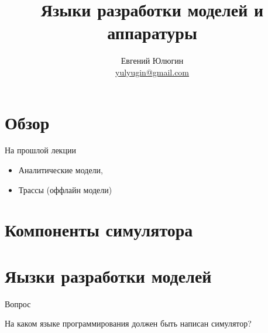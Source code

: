 

\title{Языки разработки моделей и аппаратуры}
\author[Евгений Юлюгин]{Евгений Юлюгин \\ \small{\href{mailto:yulyugin@gmail.com}{yulyugin@gmail.com}}}



\begin{frame}
\titlepage
\end{frame}

\section{Обзор}

\begin{frame}
\tableofcontents
\end{frame} 

\begin{frame}{На прошлой лекции}

\begin{itemize}
  \item Аналитические модели,
  \item Трассы (оффлайн модели)
\end{itemize}

\end{frame}

\section{Компоненты симулятора}

\begin{frame}

\begin{figure}[htp]
    \centering
\end{figure}

\end{frame}

\section{Яызки разработки моделей}

\begin{frame}{Вопрос}

На каком языке программирования должен быть написан симулятор?

\end{frame}

